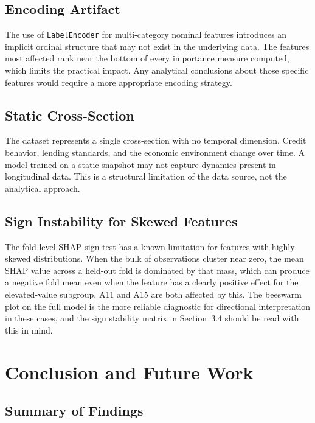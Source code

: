 \documentclass[11pt]{article}
\begin{document}
\subsection{Encoding Artifact}

The use of \texttt{LabelEncoder} for multi-category nominal features introduces an implicit ordinal structure that may not exist in the underlying data. The features most affected rank near the bottom of every importance measure computed, which limits the practical impact. Any analytical conclusions about those specific features would require a more appropriate encoding strategy.

\subsection{Static Cross-Section}

The dataset represents a single cross-section with no temporal dimension. Credit behavior, lending standards, and the economic environment change over time. A model trained on a static snapshot may not capture dynamics present in longitudinal data. This is a structural limitation of the data source, not the analytical approach.

\subsection{Sign Instability for Skewed Features}
\label{sec:skew}

The fold-level SHAP sign test has a known limitation for features with highly skewed distributions. When the bulk of observations cluster near zero, the mean SHAP value across a held-out fold is dominated by that mass, which can produce a negative fold mean even when the feature has a clearly positive effect for the elevated-value subgroup. A11 and A15 are both affected by this. The beeswarm plot on the full model is the more reliable diagnostic for directional interpretation in these cases, and the sign stability matrix in Section~3.4 should be read with this in mind.

\newpage

\section{Conclusion and Future Work}

\subsection{Summary of Findings}
\end{document}
